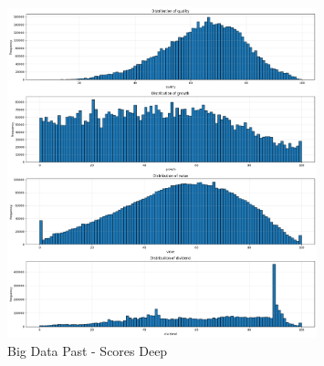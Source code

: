\documentclass[11pt,english,a4paper,hidelinks]{book}
\begin{document}
\begin{figure}[H]
\begin{minipage}{0.48\textwidth}
        \includegraphics[width=0.8\textwidth]{images/code/descriptive analysis/distributions/Big Data past - Scores Deep.png}
        \caption{Big Data Past - Scores Deep}
        \label{fig:past_scores_deep}
    \end{minipage}
\end{figure}
\end{document}
